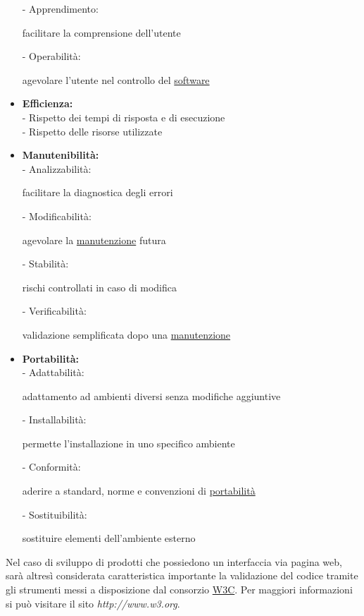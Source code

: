 \documentclass[11pt,a4paper]{article}
\begin{document}
\begin{itemize}
		- Apprendimento: \begin{small}facilitare la comprensione dell'utente \\\end{small}
		- Operabilità: \begin{small}agevolare l'utente nel controllo del \underline{software} \end{small}
	\item \textbf{Efficienza:} \\
		- Rispetto dei tempi di risposta e di esecuzione \\
		- Rispetto delle risorse utilizzate
	\item \textbf{Manutenibilità:} \\
		- Analizzabilità: \begin{small}facilitare la diagnostica degli errori \\\end{small}
		- Modificabilità: \begin{small}agevolare la \underline{manutenzione} futura \\\end{small}
		- Stabilità: \begin{small} rischi controllati in caso di modifica\\\end{small}
		- Verificabilità: \begin{small}validazione semplificata dopo una \underline{manutenzione}\end{small}
	\item \textbf{Portabilità:} \\
		- Adattabilità: \begin{small}adattamento ad ambienti diversi senza modifiche aggiuntive\\\end{small}
		- Installabilità: \begin{small}permette l'installazione in uno specifico ambiente \\\end{small}
		- Conformità: \begin{small}aderire a standard, norme e convenzioni di \underline{portabilità} \\\end{small}
		- Sostituibilità: \begin{small}sostituire elementi dell'ambiente esterno \end{small}
\end{itemize}
Nel caso di sviluppo di prodotti che possiedono un interfaccia via pagina web, sarà altresì considerata caratteristica importante la validazione del codice tramite gli strumenti messi a disposizione dal consorzio \underline{W3C}. Per maggiori informazioni si può visitare il sito \textit{http://www.w3.org}.
\end{document}
